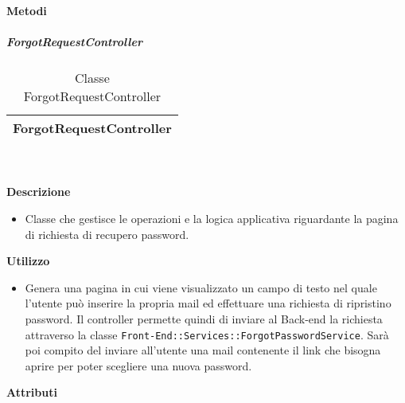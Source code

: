 		\textbf{Metodi} 
	\begin{itemize}
		\end{itemize}
			\subparagraph{ForgotRequestController} 
\begin{table}[ht]
\begin{center}
\bgroup
	\setlength{\arrayrulewidth}{0.6mm}
	\def\arraystretch{1}
		\begin{tabular}{ | p{12cm} | }
				\hline  
					\centerline{\textbf{ForgotRequestController}}
		\\ \hline 
				\hline
				\hline
		
		\end{tabular}
\egroup
\caption{Classe ForgotRequestController}
\end{center}
\end{table}  \textbf{\\ \\ Descrizione} 
					\begin{itemize}
						\item[] Classe che gestisce le operazioni e la logica applicativa riguardante la pagina di richiesta di recupero password.
					\end{itemize}      
				\textbf{Utilizzo}  
					\begin{itemize}
						\item[] Genera una pagina in cui viene visualizzato un campo di testo nel quale l'utente può inserire la propria mail ed effettuare una richiesta di ripristino password. Il controller permette quindi di inviare al Back-end la richiesta attraverso la classe \texttt{Front-End::Services::ForgotPasswordService}. Sarà poi compito del  inviare all'utente una mail contenente il link che bisogna aprire per poter scegliere una nuova password.
					\end{itemize}
			 \textbf{Attributi} 
	\begin{itemize}
		\end{itemize}
		

